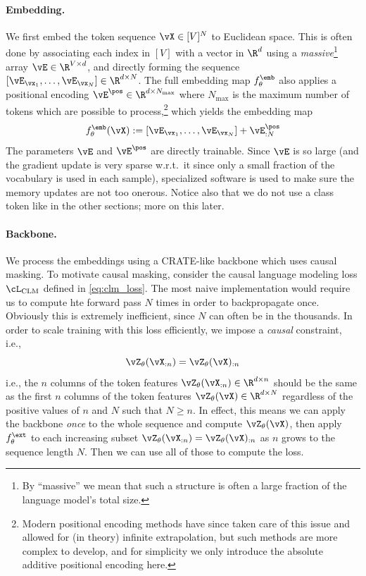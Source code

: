 \documentclass[../../book-main.tex]{subfiles}
\begin{document}
\paragraph{Embedding.} We first embed the token sequence \(\vX \in [V]^{N}\) to Euclidean space. This is often done by associating each index in \([V]\) with a vector in \(\R^{d}\) using a \textit{massive}\footnote{By ``massive'' we mean that such a structure is often a large fraction of the language model's total size.} array \(\vE \in \R^{V \times d}\), and directly forming the sequence \([\vE_{\vx_{1}}, \dots, \vE_{\vx_{N}}] \in \R^{d \times N}\). The full embedding map \(f_{\theta}^{\emb}\) also applies a positional encoding \(\vE^{\pos} \in \R^{d  \times N_{\max}}\) where \(N_{\max}\) is the maximum number of tokens which are possible to process,\footnote{Modern positional encoding methods have since taken care of this issue and allowed for (in theory) infinite extrapolation, but such methods are more complex to develop, and for simplicity we only introduce the absolute additive positional encoding here.} which yields the embedding map 
\begin{equation}
    f_{\theta}^{\emb}(\vX) := [\vE_{\vx_{1}}, \dots, \vE_{\vx_{N}}] + \vE_{:N}^{\pos}
\end{equation}
The parameters \(\vE\) and \(\vE^{\pos}\) are directly trainable. Since \(\vE\) is so large (and the gradient update is very sparse w.r.t.~it since only a small fraction of the vocabulary is used in each sample), specialized software is used to make sure the memory updates are not too onerous. Notice also that we do not use a class token like in the other sections; more on this later.

\paragraph{Backbone.} We process the embeddings using a CRATE-like backbone which uses causal masking. To motivate causal masking, consider the causal language modeling loss \(\cL_{\mathrm{CLM}}\) defined in \eqref{eq:clm_loss}. The most naive implementation would require us to compute hte forward pass \(N\) times in order to backpropagate once. Obviously this is extremely inefficient, since \(N\) can often be in the thousands. In order to scale training with this loss efficiently, we impose a \textit{causal} constraint, i.e.,
\begin{equation}\label{eq:causal_backbone_def}
    \vZ_{\theta}(\vX_{:n}) = \vZ_{\theta}(\vX)_{:n}
\end{equation}
i.e., the \(n\) columns of the token features \(\vZ_{\theta}(\vX_{:n}) \in \R^{d \times n}\) should be the same as the first \(n\) columns of the token features \(\vZ_{\theta}(\vX) \in \R^{d \times N}\) regardless of the positive values of \(n\) and \(N\) such that \(N \geq n\). In effect, this means we can apply the backbone \textit{once} to the whole sequence and compute \(\vZ_{\theta}(\vX)\), then apply \(f_{\theta}^{\ext}\) to each increasing subset \(\vZ_{\theta}(\vX_{:n}) = \vZ_{\theta}(\vX)_{:n}\) as \(n\) grows to the sequence length \(N\). Then we can use all of those to compute the loss.
\end{document}
